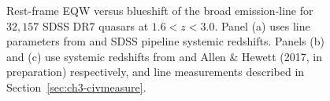 \begin{figure}
    \captionsetup[subfigure]{labelformat=empty}
    \centering
    \subfloat[\label{fig:civ_space_z_compare_a}]{}
    \subfloat[\label{fig:civ_space_z_compare_b}]{}
    \subfloat[\label{fig:civ_space_z_compare_c}]{}
    \caption[{Rest-frame EQW versus blueshift of the broad  emission-line for SDSS quasars using three different redshift estimation schemes.}]{Rest-frame EQW versus blueshift of the broad  emission-line for $32,157$ SDSS DR$7$ quasars at $1.6 < z < 3.0$. Panel (a) uses  line parameters from \citet{shen11} and SDSS pipeline systemic redshifts. Panels (b) and (c) use systemic redshifts from \citet{hewett10} and Allen \& Hewett (2017, in preparation) respectively, and  line measurements described in Section~\ref{sec:ch3-civmeasure}.}
    \label{fig:civ_space_z_compare}
\end{figure}

